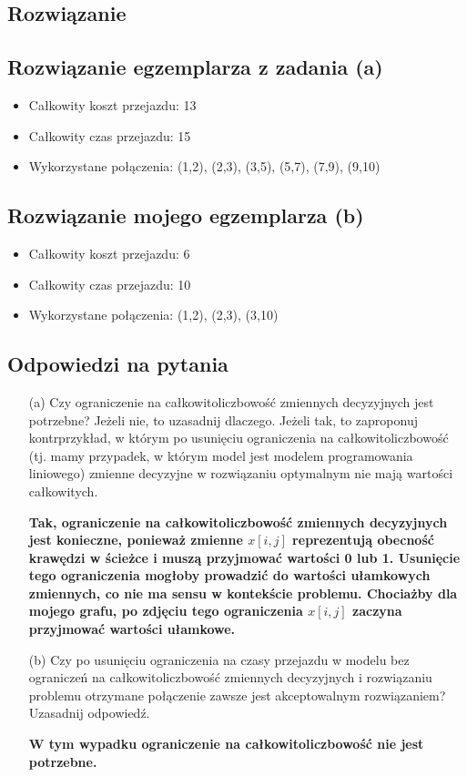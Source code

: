 \documentclass{article}
\begin{document}
\subsection{Rozwiązanie}
\subsection{Rozwiązanie egzemplarza z zadania (a)}
\begin{itemize}
    \item Całkowity koszt przejazdu: 13
    \item Całkowity czas przejazdu: 15
    \item Wykorzystane połączenia: (1,2), (2,3), (3,5), (5,7), (7,9), (9,10)
\end{itemize}

\subsection{Rozwiązanie mojego egzemplarza (b)}
\begin{itemize}
    \item Całkowity koszt przejazdu: 6
    \item Całkowity czas przejazdu: 10
    \item Wykorzystane połączenia: (1,2), (2,3), (3,10)
\end{itemize}

\subsection{Odpowiedzi na pytania}

\begin{enumerate}
    \item[(a)] Czy ograniczenie na całkowitoliczbowość zmiennych decyzyjnych jest potrzebne? Jeżeli nie, to uzasadnij dlaczego. Jeżeli tak, to zaproponuj kontrprzykład, w którym po usunięciu ograniczenia na całkowitoliczbowość (tj. mamy przypadek, w którym model jest modelem programowania liniowego) zmienne decyzyjne w rozwiązaniu optymalnym nie mają wartości całkowitych.

    \textbf{Tak, ograniczenie na całkowitoliczbowość zmiennych decyzyjnych jest konieczne, ponieważ zmienne \(x[i,j]\) reprezentują obecność krawędzi w ścieżce i muszą przyjmować wartości 0 lub 1. Usunięcie tego ograniczenia mogłoby prowadzić do wartości ułamkowych zmiennych, co nie ma sensu w kontekście problemu. Chociażby dla mojego grafu, po zdjęciu tego ograniczenia $x[i, j]$ zaczyna przyjmować wartości ułamkowe.}

    \item[(b)] Czy po usunięciu ograniczenia na czasy przejazdu w modelu bez ograniczeń na całkowitoliczbowość zmiennych decyzyjnych i rozwiązaniu problemu otrzymane połączenie zawsze jest akceptowalnym rozwiązaniem? Uzasadnij odpowiedź.

    \textbf{W tym wypadku ograniczenie na całkowitoliczbowość nie jest potrzebne.}
\end{enumerate}
\end{document}
